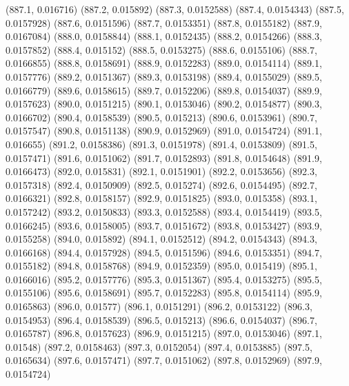 {					(887.1, 0.016716)
					(887.2, 0.015892)
					(887.3, 0.0152588)
					(887.4, 0.0154343)
					(887.5, 0.0157928)
					(887.6, 0.0151596)
					(887.7, 0.0153351)
					(887.8, 0.0155182)
					(887.9, 0.0167084)
					(888.0, 0.0158844)
					(888.1, 0.0152435)
					(888.2, 0.0154266)
					(888.3, 0.0157852)
					(888.4, 0.015152)
					(888.5, 0.0153275)
					(888.6, 0.0155106)
					(888.7, 0.0166855)
					(888.8, 0.0158691)
					(888.9, 0.0152283)
					(889.0, 0.0154114)
					(889.1, 0.0157776)
					(889.2, 0.0151367)
					(889.3, 0.0153198)
					(889.4, 0.0155029)
					(889.5, 0.0166779)
					(889.6, 0.0158615)
					(889.7, 0.0152206)
					(889.8, 0.0154037)
					(889.9, 0.0157623)
					(890.0, 0.0151215)
					(890.1, 0.0153046)
					(890.2, 0.0154877)
					(890.3, 0.0166702)
					(890.4, 0.0158539)
					(890.5, 0.015213)
					(890.6, 0.0153961)
					(890.7, 0.0157547)
					(890.8, 0.0151138)
					(890.9, 0.0152969)
					(891.0, 0.0154724)
					(891.1, 0.016655)
					(891.2, 0.0158386)
					(891.3, 0.0151978)
					(891.4, 0.0153809)
					(891.5, 0.0157471)
					(891.6, 0.0151062)
					(891.7, 0.0152893)
					(891.8, 0.0154648)
					(891.9, 0.0166473)
					(892.0, 0.015831)
					(892.1, 0.0151901)
					(892.2, 0.0153656)
					(892.3, 0.0157318)
					(892.4, 0.0150909)
					(892.5, 0.015274)
					(892.6, 0.0154495)
					(892.7, 0.0166321)
					(892.8, 0.0158157)
					(892.9, 0.0151825)
					(893.0, 0.015358)
					(893.1, 0.0157242)
					(893.2, 0.0150833)
					(893.3, 0.0152588)
					(893.4, 0.0154419)
					(893.5, 0.0166245)
					(893.6, 0.0158005)
					(893.7, 0.0151672)
					(893.8, 0.0153427)
					(893.9, 0.0155258)
					(894.0, 0.015892)
					(894.1, 0.0152512)
					(894.2, 0.0154343)
					(894.3, 0.0166168)
					(894.4, 0.0157928)
					(894.5, 0.0151596)
					(894.6, 0.0153351)
					(894.7, 0.0155182)
					(894.8, 0.0158768)
					(894.9, 0.0152359)
					(895.0, 0.015419)
					(895.1, 0.0166016)
					(895.2, 0.0157776)
					(895.3, 0.0151367)
					(895.4, 0.0153275)
					(895.5, 0.0155106)
					(895.6, 0.0158691)
					(895.7, 0.0152283)
					(895.8, 0.0154114)
					(895.9, 0.0165863)
					(896.0, 0.01577)
					(896.1, 0.0151291)
					(896.2, 0.0153122)
					(896.3, 0.0154953)
					(896.4, 0.0158539)
					(896.5, 0.015213)
					(896.6, 0.0154037)
					(896.7, 0.0165787)
					(896.8, 0.0157623)
					(896.9, 0.0151215)
					(897.0, 0.0153046)
					(897.1, 0.01548)
					(897.2, 0.0158463)
					(897.3, 0.0152054)
					(897.4, 0.0153885)
					(897.5, 0.0165634)
					(897.6, 0.0157471)
					(897.7, 0.0151062)
					(897.8, 0.0152969)
					(897.9, 0.0154724)
}
